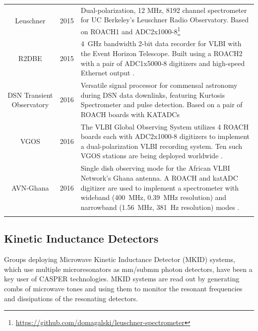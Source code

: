 \documentclass{ws-jai}
\begin{document}
\begin{longtable}{ccp{10cm}}
  Leuschner        & 2015 & Dual-polarization, 12 MHz, 8192 channel spectrometer for UC Berkeley's Leuschner Radio Observatory. Based on ROACH1 and ADC2x1000-8\footnote{\url{https://github.com/domagalski/leuschner-spectrometer}} \\
  R2DBE            & 2015 & 4~GHz bandwidth 2-bit data recorder for VLBI with the Event Horizon Telescope. Built using a ROACH2 with a pair of ADC1x5000-8 digitizers and high-speed Ethernet output \citep{r2dbe}. \\
  DSN Transient Observatory & 2016 & Versatile signal processor for commensal astronomy during DSN data downlinks, featuring Kurtosis Spectrometer and pulse detection. Based on a pair of ROACH boards with KATADCs \citep{dsn-transient-observatory} \\
  VGOS             & 2016 & The VLBI Global Observing System utilizes 4 ROACH boards each with ADC2x1000-8 digitizers to implement a dual-polarization VLBI recording system. Ten such VGOS stations are being deployed worldwide \citep{2012ivs..conf....8H}.\\
  AVN-Ghana        & 2016 & Single dish observing mode for the African VLBI Network's Ghana antenna. A ROACH and katADC digitizer are used to implement a spectrometer with wideband (400~MHz, 0.39~MHz resolution) and narrowband (1.56~MHz, 381~Hz resolution) modes \citep{avn}.\\
  \label{table:casper-instruments-spectrometers}
\end{longtable}

\subsection{Kinetic Inductance Detectors}

Groups deploying Microwave Kinetic Inductance Detector (MKID) systems, which use multiple microresonators as mm/submm photon detectors, have been a key user of CASPER technologies. MKID systems are read out by generating combs of microwave tones and using them to monitor the resonant frequencies and dissipations of the resonating detectors.
\end{document}
